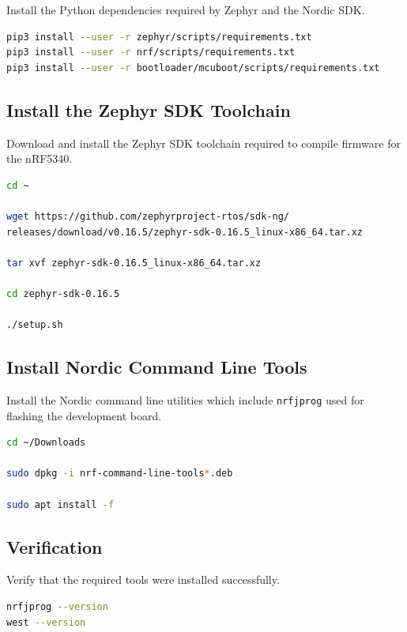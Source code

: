 \documentclass[conference]{IEEEtran}
\begin{document}
Install the Python dependencies required by Zephyr and the Nordic SDK.

\begin{lstlisting}[language=bash]
pip3 install --user -r zephyr/scripts/requirements.txt
pip3 install --user -r nrf/scripts/requirements.txt
pip3 install --user -r bootloader/mcuboot/scripts/requirements.txt
\end{lstlisting}

\subsection{Install the Zephyr SDK Toolchain}

Download and install the Zephyr SDK toolchain required to compile firmware for the nRF5340.

\begin{lstlisting}[language=bash]
cd ~

wget https://github.com/zephyrproject-rtos/sdk-ng/
releases/download/v0.16.5/zephyr-sdk-0.16.5_linux-x86_64.tar.xz

tar xvf zephyr-sdk-0.16.5_linux-x86_64.tar.xz

cd zephyr-sdk-0.16.5

./setup.sh
\end{lstlisting}

\subsection{Install Nordic Command Line Tools}

Install the Nordic command line utilities which include \texttt{nrfjprog} used for flashing the development board.

\begin{lstlisting}[language=bash]
cd ~/Downloads

sudo dpkg -i nrf-command-line-tools*.deb

sudo apt install -f
\end{lstlisting}

\subsection{Verification}

Verify that the required tools were installed successfully.

\begin{lstlisting}[language=bash]
nrfjprog --version
west --version
\end{lstlisting}
\end{document}
